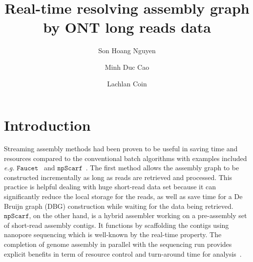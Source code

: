 \documentclass[10pt,twocolumn,twoside]{genpaper}
\title{Real-time resolving assembly graph by ONT long reads data}
\author[1,$\ast$]{Son Hoang Nguyen}
\author[2]{Minh Duc Cao}
\author[1,$\ast$]{Lachlan Coin}
\affil[1]{Institute for Molecular Bioscience, the University of Queensland, 
St Lucia, Brisbane, QLD 4072 Australia}
\affil[2]{4catalyzer}
\newcommand{\npscarf}{$\mathtt{npScarf}$}
\newcommand{\EG}{\emph{e.g.}}
\begin{document}
\maketitle
\thispagestyle{fancy}

\section*{Introduction}
Streaming assembly methods had been proven to be useful in saving time and resources compared to the conventional batch algorithms with examples included \EG{} $\mathtt{Faucet}$~\cite{Rozov2017faucet} and \npscarf{}~\cite{Cao2017scaffolding}. The first method allows the assembly graph to be constructed incrementally as long as reads are retrieved and processed. This practice is helpful dealing with huge short-read data set because it can significantly reduce the local storage for the reads, as well as save time for a De Bruijn graph (DBG) construction while waiting for the data being retrieved.
\npscarf{}, on the other hand, is a hybrid assembler working on a pre-assembly set of short-read assembly contigs. It functions by scaffolding the contigs using nanopore sequencing which is well-known by the real-time property. The completion of genome assembly in parallel with the sequencing run provides explicit benefits in term of resource control and turn-around time for analysis~\cite{Cao2017scaffolding}.  
\end{document}
